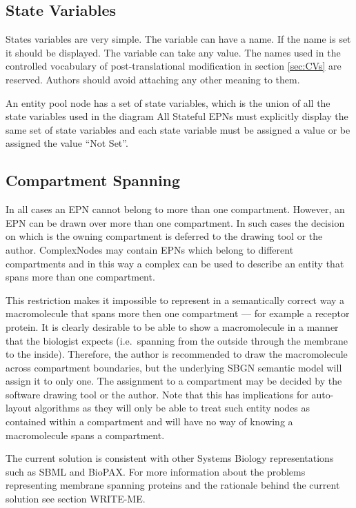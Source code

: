 \subsection{State Variables}

States variables are very simple. The variable can have a name. If the
name is set it should be displayed. The variable can take any
value. The names used in the controlled vocabulary of
post-translational modification in section \ref{sec:CVs} are
reserved. Authors should avoid attaching any other meaning to them.

An entity pool node has a set of state variables, which is the union
of all the state variables used in the diagram 
All Stateful EPNs must explicitly display the same set of
state variables and each state variable must be assigned a value or be
assigned the value ``Not Set''.

\subsection{Compartment Spanning}

In all cases an EPN cannot belong to more than one
compartment. However, an EPN can be drawn over more than one
compartment. In such cases the decision on which is the owning
compartment is deferred to the drawing tool or the
author. ComplexNodes may contain EPNs which belong to different
compartments and in this way a complex can be used to describe an
entity that spans more than one compartment.

This restriction makes it impossible to represent in a semantically
correct way a macromolecule that spans more then one compartment ---
for example a receptor protein. It is clearly desirable to be able to
show a macromolecule in a manner that the biologist expects (i.e.\,
spanning from the outside through the membrane to the
inside). Therefore, the author is recommended to draw the
macromolecule across compartment boundaries, but the underlying SBGN
semantic model will assign it to only one. The assignment to a
compartment may be decided by the software drawing tool or the
author. Note that this has implications for auto-layout algorithms as
they will only be able to treat such entity nodes as contained within
a compartment and will have no way of knowing a macromolecule spans a
compartment.

The current solution is consistent with other Systems Biology
representations such as SBML and BioPAX. For more information about the
problems representing membrane spanning proteins and the rationale
behind the current solution see section WRITE-ME.

